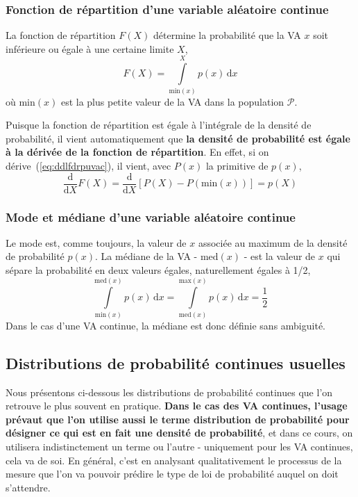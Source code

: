 \documentclass[main.tex]{subfiles}
\begin{document}
\subsubsection{Fonction de répartition d'une variable aléatoire continue}

La fonction de répartition $F(X)$ détermine la probabilité que la VA $x$ soit inférieure ou égale à une certaine limite $X$,
\begin{equation}
    F(X)=\int\limits_{\text{min}(x)}^X p(x)\,\text{d}x
    \label{eq:ddlfdrpuvac}
\end{equation}
où $\text{min}(x)$ est la plus petite valeur de la VA dans la population $\mathcal{P}$.

Puisque la fonction de répartition est égale à l'intégrale de la densité de probabilité, il vient automatiquement que \textbf{la densité de probabilité est égale à la dérivée de la fonction de répartition}. En effet, si on dérive~(\ref{eq:ddlfdrpuvac}), il vient, avec $P(x)$ la primitive de $p(x)$,
$$
    \frac{\text{d}}{\text{d}X}F(X)=
    \frac{\text{d}}{\text{d}X}\left[P(X)-P(\text{min}(x))\right]=p(X)
$$

\subsubsection{Mode et médiane d'une variable aléatoire continue}

Le mode est, comme toujours, la valeur de $x$ associée au maximum de la densité de probabilité $p(x)$. La médiane de la VA - $\text{med}(x)$ - est la valeur de $x$ qui sépare la probabilité en deux valeurs égales, naturellement égales à 1/2,
\begin{equation}
    \int\limits_{\text{min}(x)}^{\text{med}(x)} p(x)\,\text{d}x=
    \int\limits_{\text{med}(x)}^{\text{max}(x)} p(x)\,\text{d}x=\frac{1}{2}
\end{equation}
Dans le cas d'une VA continue, la médiane est donc définie sans ambiguité.

\subsection{Distributions de probabilité continues usuelles}

Nous présentons ci-dessous les distributions de probabilité continues que l'on retrouve le plus souvent en pratique. {\bf Dans le cas des VA continues, l'usage prévaut que l'on utilise aussi le terme distribution de probabilité pour désigner ce qui est en fait une densité de probabilité}, et dans ce cours, on utilisera indistinctement un terme ou l'autre - uniquement pour les VA continues, cela va de soi. En général, c'est en analysant qualitativement le processus de la mesure que l'on va pouvoir prédire le type de loi de probabilité auquel on doit s'attendre.
\end{document}
